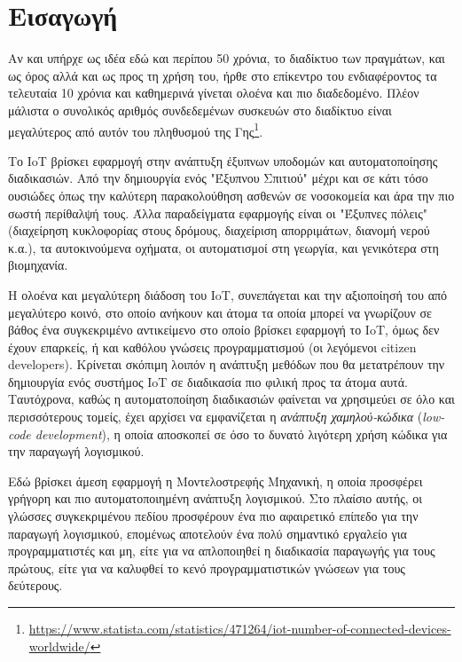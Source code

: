 \chapter{Εισαγωγή}
\label{chapter:intro}

\setlength{\parskip}{1em}

Αν και υπήρχε ως ιδέα εδώ και περίπου 50 χρόνια, το διαδίκτυο των πραγμάτων, και ως όρος αλλά και ως προς τη χρήση του, ήρθε στο επίκεντρο του ενδιαφέροντος τα τελευταία 10 χρόνια και καθημερινά γίνεται ολοένα και πιο διαδεδομένο. Πλέον μάλιστα ο συνολικός αριθμός συνδεδεμένων συσκευών στο διαδίκτυο είναι μεγαλύτερος από αυτόν του πληθυσμού της Γης\footnote{\url{https://www.statista.com/statistics/471264/iot-number-of-connected-devices-worldwide/}}.

Το IoT βρίσκει εφαρμογή στην ανάπτυξη έξυπνων υποδομών και αυτοματοποίησης διαδικασιών. Από την δημιουργία ενός "Έξυπνου Σπιτιού" μέχρι και σε κάτι τόσο ουσιώδες όπως την καλύτερη παρακολούθηση ασθενών σε νοσοκομεία και άρα την πιο σωστή περίθαλψή τους. Άλλα παραδείγματα εφαρμογής είναι οι "Έξυπνες πόλεις" (διαχείρηση κυκλοφορίας στους δρόμους, διαχείριση απορριμάτων, διανομή νερού κ.α.), τα αυτοκινούμενα οχήματα, οι αυτοματισμοί στη γεωργία, και γενικότερα στη βιομηχανία.

Η ολοένα και μεγαλύτερη διάδοση του IoT, συνεπάγεται και την αξιοποίησή του από μεγαλύτερο κοινό, στο οποίο ανήκουν και άτομα τα οποία μπορεί να γνωρίζουν σε βάθος ένα συγκεκριμένο αντικείμενο στο οποίο βρίσκει εφαρμογή το IoT, όμως δεν έχουν επαρκείς, ή και καθόλου γνώσεις προγραμματισμού (οι λεγόμενοι citizen developers). Κρίνεται σκόπιμη λοιπόν η ανάπτυξη μεθόδων που θα μετατρέπουν την δημιουργία ενός συστήμος IoT σε διαδικασία πιο φιλική προς τα άτομα αυτά. Ταυτόχρονα, καθώς η αυτοματοποίηση διαδικασιών φαίνεται να χρησιμεύει σε όλο και περισσότερους τομείς, έχει αρχίσει να εμφανίζεται η \textit{ανάπτυξη χαμηλού-κώδικα} (\textit{low-code development}), η οποία αποσκοπεί σε όσο το δυνατό λιγότερη χρήση κώδικα για την παραγωγή λογισμικού. 

Εδώ βρίσκει άμεση εφαρμογή η Μοντελοστρεφής Μηχανική, η οποία προσφέρει γρήγορη και πιο αυτοματοποιημένη ανάπτυξη λογισμικού. Στο πλαίσιο αυτής, οι γλώσσες συγκεκριμένου πεδίου προσφέρουν ένα πιο αφαιρετικό επίπεδο για την παραγωγή λογισμικού, επομένως αποτελούν ένα πολύ σημαντικό εργαλείο για προγραμματιστές και μη, είτε για να απλοποιηθεί η διαδικασία παραγωγής για τους πρώτους, είτε για να καλυφθεί το κενό προγραμματιστικών γνώσεων για τους δεύτερους.




